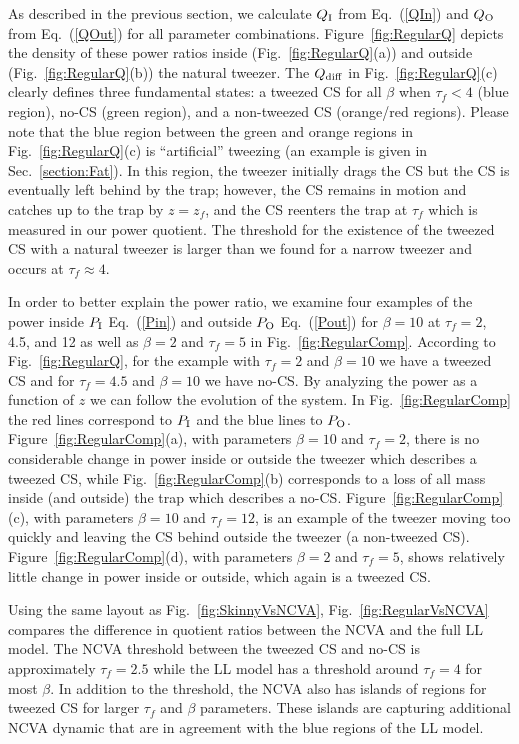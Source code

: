 As described in the previous section, we calculate $Q_{\rm I}$ from Eq.~(\ref{QIn}) and $Q_{\rm O}$ from Eq.~(\ref{QOut}) for all parameter combinations.  Figure~\ref{fig:RegularQ} depicts the density of these power ratios inside (Fig.~\ref{fig:RegularQ}(a)) and outside (Fig.~\ref{fig:RegularQ}(b)) the natural tweezer.  The $Q_{\rm diff}$ in Fig.~\ref{fig:RegularQ}(c) clearly defines three fundamental states: a tweezed CS for all $\beta$ when $\tau_f < 4$ (blue region), no-CS (green region), and a non-tweezed CS (orange/red regions).  Please note that the blue region between the green and orange regions in Fig.~\ref{fig:RegularQ}(c) is ``artificial'' tweezing (an example is given in Sec.~\ref{section:Fat}).  In this region, the tweezer initially drags the CS but the CS is eventually left behind by the trap; however, the CS remains in motion and catches up to the trap by $z = z_f$, and the CS reenters the trap at $\tau_f$ which is measured in our power quotient.  The threshold for the existence of the tweezed CS with a natural tweezer is larger than we found for a narrow tweezer and occurs at $\tau_f \approx 4$.

In order to better explain the power ratio, we examine four examples of the power inside $P_{\rm I}$ Eq.~(\ref{Pin}) and outside $P_{\rm O}$ Eq.~(\ref{Pout}) for $\beta = 10$ at $\tau_f = 2$, 4.5, and 12 as well as $\beta = 2$ and $\tau_f = 5$ in Fig.~\ref{fig:RegularComp}.  According to Fig.~\ref{fig:RegularQ}, for the example with $\tau_f = 2$ and $\beta=10$ we have a tweezed CS and for $\tau_f=4.5$ and $\beta = 10$ we have no-CS.   By analyzing the power as a function of $z$ we can follow the evolution of the system.  In Fig.~\ref{fig:RegularComp} the red lines correspond to $P_{\rm I}$ and the blue lines to $P_{\rm O}$.  Figure~\ref{fig:RegularComp}(a), with parameters $\beta = 10$ and $\tau_f = 2$, there is no considerable change in power inside or outside the tweezer which describes a tweezed CS, while Fig.~\ref{fig:RegularComp}(b) corresponds to a loss of all mass inside (and outside) the trap which describes a no-CS.  Figure~\ref{fig:RegularComp}(c), with parameters $\beta = 10$ and $\tau_f = 12$, is an example of the tweezer moving too quickly and leaving the CS behind outside the tweezer (a non-tweezed CS).  Figure~\ref{fig:RegularComp}(d), with parameters $\beta = 2$ and $\tau_f = 5$, shows relatively little change in power inside or outside, which again is a tweezed CS.

Using the same layout as Fig.~\ref{fig:SkinnyVsNCVA}, Fig.~\ref{fig:RegularVsNCVA} compares the difference in quotient ratios between the NCVA and the full LL model.  The NCVA threshold between the tweezed CS and no-CS is approximately $\tau_f = 2.5$ while the LL model has a threshold around $\tau_f = 4$ for most $\beta$.  In addition to the threshold, the NCVA also has islands of regions for tweezed CS for larger $\tau_f$ and $\beta$ parameters.  These islands are capturing additional NCVA dynamic that are in agreement with the blue regions of the LL model.


